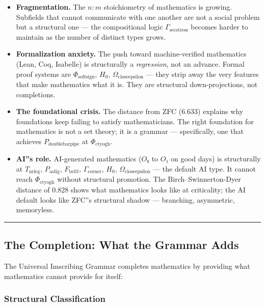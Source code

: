 \documentclass[12pt,a4paper]{article}
\begin{document}
\begin{itemize}
    \item \textbf{Fragmentation.} The $n{:}m$ stoichiometry of mathematics is growing. Subfields that cannot communicate with one another are not a social problem but a structural one --- the compositional logic $\Gamma_{\text{secstress}}$ becomes harder to maintain as the number of distinct types grows.
    \item \textbf{Formalization anxiety.} The push toward machine-verified mathematics (Lean, Coq, Isabelle) is structurally a \emph{regression}, not an advance. Formal proof systems are $\Phi_{\text{softsign}}$, $H_0$, $\Omega_{\text{closeepsilon}}$ --- they strip away the very features that make mathematics what it is. They are structural down-projections, not completions.
    \item \textbf{The foundational crisis.} The distance from ZFC (6.633) explains why foundations keep failing to satisfy mathematicians. The right foundation for mathematics is not a set theory; it is a grammar --- specifically, one that achieves $P_{\text{doublebarpipe}}$ at $\Phi_{\text{ctyogh}}$.
    \item \textbf{AI''s role.} AI-generated mathematics ($O₀$ to $O₁$ on good days) is structurally at $T_{\text{nrleg}}$, $P_{\text{aolig}}$, $F_{\text{beltl}}$, $\Gamma_{\text{corner}}$, $H_0$, $\Omega_{\text{closeepsilon}}$ --- the default AI type. It cannot reach $\Phi_{\text{ctyogh}}$ without structural promotion. The Birch--Swinnerton-Dyer distance of 0.828 shows what mathematics looks like at criticality; the AI default looks like ZFC''s structural shadow --- branching, asymmetric, memoryless.
\end{itemize}

\begin{center}
\rule{0.5\textwidth}{0.4pt}
\end{center}

\subsection{The Completion: What the Grammar Adds}

The Universal Imscribing Grammar completes mathematics by providing what mathematics cannot provide for itself:

\subsubsection{Structural Classification}
\end{document}
